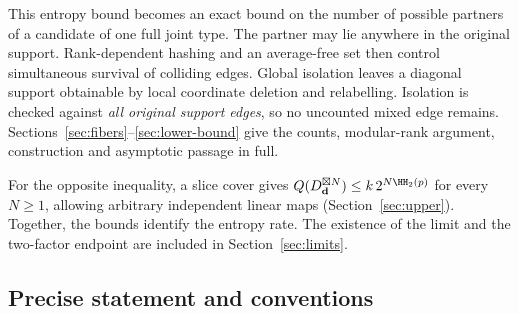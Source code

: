 This entropy bound becomes an exact bound on the number of possible
partners of a candidate of one full joint type. The partner may lie
anywhere in the original support. Rank-dependent hashing and an
average-free set then control simultaneous survival of colliding
edges. Global isolation leaves a diagonal support obtainable by local
coordinate deletion and relabelling. Isolation is checked against
\emph{all original support edges}, so no uncounted mixed edge remains.
Sections~\ref{sec:fibers}--\ref{sec:lower-bound} give the counts,
modular-rank argument, construction and asymptotic passage in full.

For the opposite inequality, a slice cover gives
$Q(D_{\mathbf d}^{\boxtimes N})\leq k\,2^{N\HH_2(p)}$ for every
$N\geq1$, allowing arbitrary independent linear maps
(Section~\ref{sec:upper}). Together, the bounds identify the entropy
rate. The existence of the limit and the two-factor endpoint are
included in Section~\ref{sec:limits}.

\subsection*{Precise statement and conventions}
